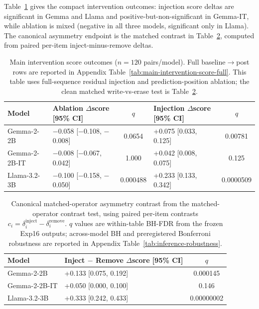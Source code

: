 Table~\ref{tab:main-intervention-score} gives the compact intervention outcomes: injection score deltas are significant in Gemma and Llama and positive-but-non-significant in Gemma-IT, while ablation is mixed (negative in all three models, significant only in Llama). The canonical asymmetry endpoint is the matched contrast in Table~\ref{tab:matched-contrast}, computed from paired per-item inject-minus-remove deltas.

\begin{table}[t]
\centering
\footnotesize
\setlength{\tabcolsep}{2.5pt}
\begin{tabular}{@{}l p{} c p{} c@{}}
\toprule
Model & Ablation $\Delta$score [95\% CI] & $q$ & Injection $\Delta$score [95\% CI] & $q$ \\
\midrule
Gemma-2-2B & $-$0.058 [$-$0.108, $-$0.008] & 0.0654 & +0.075 [0.033, 0.125] & 0.00781 \\
Gemma-2-2B-IT & $-$0.008 [$-$0.067, 0.042] & 1.000 & +0.042 [0.008, 0.075] & 0.125 \\
Llama-3.2-3B & $-$0.100 [$-$0.158, $-$0.050] & 0.000488 & +0.233 [0.133, 0.342] & 0.0000509 \\
\bottomrule
\end{tabular}
\caption{Main intervention score outcomes ($n=120$ pairs/model). Full baseline$\rightarrow$post rows are reported in Appendix Table~\ref{tab:main-intervention-score-full}. This table uses full-sequence residual injection and prediction-position ablation; the clean matched write-vs-erase test is Table~\ref{tab:matched-contrast}.}
\label{tab:main-intervention-score}
\end{table}

\begin{table}[tbp]
\centering
\footnotesize
\setlength{\tabcolsep}{3pt}
\begin{tabular}{@{}l p{} c@{}}
\toprule
Model & Inject $-$ Remove $\Delta$score [95\% CI] & $q$ \\
\midrule
Gemma-2-2B & +0.133 [0.075, 0.192] & 0.000145 \\
Gemma-2-2B-IT & +0.050 [0.000, 0.100] & 0.146 \\
Llama-3.2-3B & +0.333 [0.242, 0.433] & 0.00000002 \\
\bottomrule
\end{tabular}
\caption{Canonical matched-operator asymmetry contrast from the matched-operator contrast test, using paired per-item contrasts $c_i=\delta_i^{\text{inject}}-\delta_i^{\text{remove}}$. $q$ values are within-table BH-FDR from the frozen Exp16 outputs; across-model BH and preregistered Bonferroni robustness are reported in Appendix Table~\ref{tab:inference-robustness}.}
\label{tab:matched-contrast}
\end{table}

